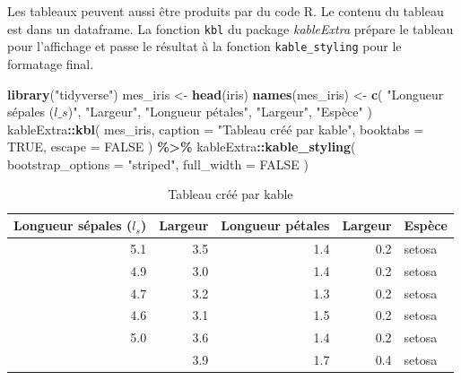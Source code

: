 \documentclass[
  12pt,
  french,
  a4paper,
  extrafontsizes,onecolumn,openright
  ]{memoir}
\newenvironment{Shaded}{\begin{snugshade}}{\end{snugshade}}
\newcommand{\AttributeTok}[1]{\textcolor[rgb]{0.13,0.29,0.53}{#1}}
\newcommand{\ConstantTok}[1]{\textcolor[rgb]{0.56,0.35,0.01}{#1}}
\newcommand{\FunctionTok}[1]{\textcolor[rgb]{0.13,0.29,0.53}{\textbf{#1}}}
\newcommand{\NormalTok}[1]{#1}
\newcommand{\OtherTok}[1]{\textcolor[rgb]{0.56,0.35,0.01}{#1}}
\newcommand{\SpecialCharTok}[1]{\textcolor[rgb]{0.81,0.36,0.00}{\textbf{#1}}}
\newcommand{\StringTok}[1]{\textcolor[rgb]{0.31,0.60,0.02}{#1}}
\begin{document}
Les tableaux peuvent aussi être produits par du code R.
Le contenu du tableau est dans un dataframe.
La fonction \texttt{kbl} du package \emph{kableExtra} prépare le tableau pour l'affichage et passe le résultat à la fonction \texttt{kable\_styling} pour le formatage final.

\scriptsize

\begin{Shaded}
\begin{Highlighting}[]
\FunctionTok{library}\NormalTok{(}\StringTok{"tidyverse"}\NormalTok{)}
\NormalTok{mes\_iris }\OtherTok{\textless{}{-}} \FunctionTok{head}\NormalTok{(iris)}
\FunctionTok{names}\NormalTok{(mes\_iris) }\OtherTok{\textless{}{-}} \FunctionTok{c}\NormalTok{(}
  \StringTok{"Longueur sépales ($l\_s$)"}\NormalTok{, }
  \StringTok{"Largeur"}\NormalTok{, }
  \StringTok{"Longueur pétales"}\NormalTok{, }
  \StringTok{"Largeur"}\NormalTok{, }
  \StringTok{"Espèce"}
\NormalTok{)}
\NormalTok{kableExtra}\SpecialCharTok{::}\FunctionTok{kbl}\NormalTok{(}
\NormalTok{  mes\_iris, }
  \AttributeTok{caption =} \StringTok{"Tableau créé par kable"}\NormalTok{, }
  \AttributeTok{booktabs =} \ConstantTok{TRUE}\NormalTok{, }
  \AttributeTok{escape =} \ConstantTok{FALSE}
\NormalTok{) }\SpecialCharTok{\%\textgreater{}\%}
\NormalTok{  kableExtra}\SpecialCharTok{::}\FunctionTok{kable\_styling}\NormalTok{(}
    \AttributeTok{bootstrap\_options =} \StringTok{"striped"}\NormalTok{, }
    \AttributeTok{full\_width =} \ConstantTok{FALSE}
\NormalTok{  )}
\end{Highlighting}
\end{Shaded}

\begin{table}
\centering
\caption{\label{tab:kable}Tableau créé par kable}
\centering
\begin{tabular}[t]{rrrrl}
\toprule
Longueur sépales ($l_s$) & Largeur & Longueur pétales & Largeur & Espèce\\
\midrule
5.1 & 3.5 & 1.4 & 0.2 & setosa\\
4.9 & 3.0 & 1.4 & 0.2 & setosa\\
4.7 & 3.2 & 1.3 & 0.2 & setosa\\
4.6 & 3.1 & 1.5 & 0.2 & setosa\\
5.0 & 3.6 & 1.4 & 0.2 & setosa\\
\addlinespace
5.4 & 3.9 & 1.7 & 0.4 & setosa\\
\bottomrule
\end{tabular}
\end{table}
\end{document}
